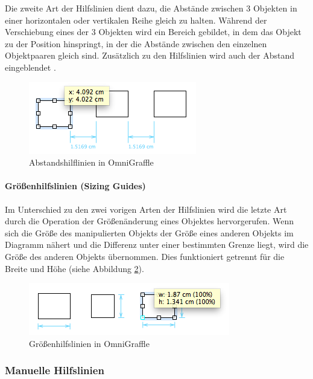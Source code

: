 Die zweite Art der Hilfslinien dient dazu, die Abstände zwischen 3 Objekten in einer horizontalen oder vertikalen Reihe gleich zu halten. Während der Verschiebung eines der 3 Objekten wird ein Bereich gebildet, in dem das Objekt zu der Position hinspringt, in der die Abstände zwischen den einzelnen Objektpaaren gleich sind. Zusätzlich zu den Hilfslinien wird auch der Abstand eingeblendet \cite{11Keynote, Olsen10OmniGraffle}.

\begin{figure}[hbt]
    \centering
    \includegraphics{resources/omnigraffle-distance-guides.png}
    \caption{Abstandshilflinien in OmniGraffle}
    \label{fig:omnigraffle-distance-guides}
\end{figure}

\paragraph{Größenhilfslinien (Sizing Guides)}

Im Unterschied zu den zwei vorigen Arten der Hilfslinien wird die letzte Art durch die Operation der Größenänderung eines Objektes hervorgerufen. Wenn sich die Größe des manipulierten Objekts der Größe eines anderen Objekts im Diagramm nähert und die Differenz unter einer bestimmten Grenze liegt, wird die Größe des anderen Objekts übernommen. Dies funktioniert getrennt für die Breite und Höhe (siehe Abbildung \ref{fig:omnigraffle-sizing-guides}).

\begin{figure}[hbt]
    \centering
    \includegraphics{resources/omnigraffle-sizing-guides.png}
    \caption{Größenhilfslinien in OmniGraffle}
    \label{fig:omnigraffle-sizing-guides}
\end{figure}

\subsubsection{Manuelle Hilfslinien}

